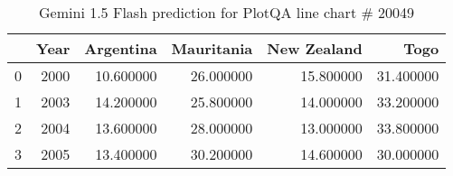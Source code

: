 \begin{table}
    \begin{tabular}{lrrrrr}
\toprule
 & Year & Argentina & Mauritania & New Zealand & Togo \\
\midrule
0 & 2000 & 10.600000 & 26.000000 & 15.800000 & 31.400000 \\
1 & 2003 & 14.200000 & 25.800000 & 14.000000 & 33.200000 \\
2 & 2004 & 13.600000 & 28.000000 & 13.000000 & 33.800000 \\
3 & 2005 & 13.400000 & 30.200000 & 14.600000 & 30.000000 \\
\bottomrule
\end{tabular}
    \caption{Gemini 1.5 Flash prediction for PlotQA line chart \# 20049}
    \label{tab:gemini-plotqa-line-20049}
\end{table}
